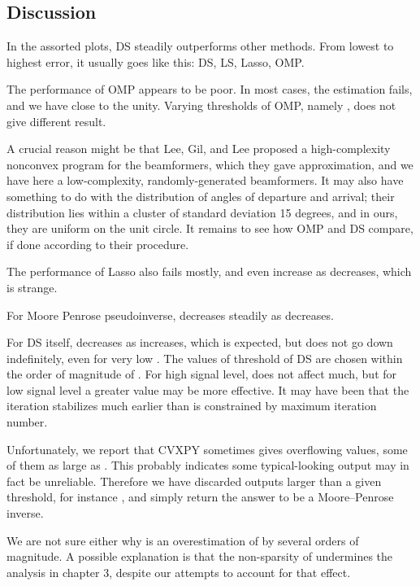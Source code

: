 \subsection {Discussion}

In the assorted plots, DS steadily outperforms other methods.
From lowest to highest error, it usually goes like this: DS, LS, Lasso, OMP.

The performance of OMP appears to be poor.
In most cases, the estimation fails, and we have \m {\tilde {\chi}} close to the unity.
Varying thresholds of OMP, namely , does not give different result.

A crucial reason might be that Lee, Gil, and Lee \cite {LGL16} proposed a high-complexity nonconvex program for the beamformers, which they gave approximation, and we have here a low-complexity, randomly-generated beamformers.
It may also have something to do with the distribution of angles of departure and arrival;
their distribution lies within a cluster of standard deviation 15 degrees, and in ours, they are uniform on the unit circle.
It remains to see how OMP and DS compare, if done according to their procedure.

The performance of Lasso also fails mostly, and \m {\tilde {\chi}} even increase as \m {\s} decreases, which is strange.

For Moore Penrose pseudoinverse, \m {\tilde {\chi}} decreases steadily as \m {\s} decreases.

For DS itself, \m {\tilde {\chi}} decreases as \m {\s} increases, which is expected, but \m {\tilde {\chi}} does not go down indefinitely, even for very low \m {\s}.
The values of threshold of DS  are chosen within the order of magnitude of \m {\s}.
For high signal level,  does not affect much, but for low signal level a greater value may be more effective.
It may have been that the iteration stabilizes much earlier than is constrained by maximum iteration number.

Unfortunately, we report that CVXPY sometimes gives overflowing values, some of them as large as .
This probably indicates some typical-looking output may in fact be unreliable.
Therefore we have discarded outputs larger than a given threshold, for instance , and simply return the answer to be a Moore–Penrose inverse.

We are not sure either why \m {\tilde {\chi}} is an overestimation of \m {\chi} by several orders of magnitude.
A possible explanation is that the non-sparsity of  undermines the analysis in chapter 3, despite our attempts to account for that effect.

